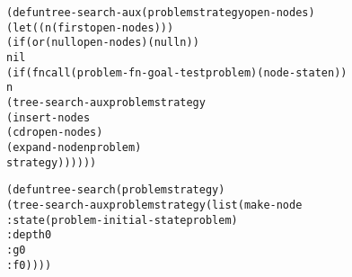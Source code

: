 \begin{aibox}{\code}
\begin{alltt}
(defun tree-search-aux (problem strategy open-nodes)
    (let ((n (first open-nodes)))
        (if ( or (null open-nodes) (null n))
            nil
            (if  (fncall (problem-fn-goal-test problem) (node-state n))
              n
              (tree-search-aux problem strategy  
                    (insert-nodes 
                        (cdr open-nodes)
                        (expand-node n problem)
                        strategy))))))

(defun tree-search (problem strategy)
  (tree-search-aux problem strategy (list (make-node
                                          :state (problem-initial-state problem)
                                          :depth 0
                                          :g 0
                                          :f 0))))





\end{alltt}
\end{aibox}
